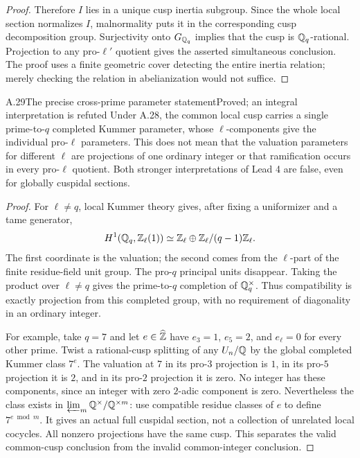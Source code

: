 \begin{proof}
Therefore $I$ lies in a unique cusp inertia subgroup. Since the whole local section normalizes $I$, malnormality puts it in the corresponding cusp decomposition group. Surjectivity onto $G_{\mathbb Q_q}$ implies that the cusp is $\mathbb Q_q$-rational. Projection to any pro-$\ell'$ quotient gives the asserted simultaneous conclusion. The proof uses a finite geometric cover detecting the entire inertia relation; merely checking the relation in abelianization would not suffice.
\end{proof}

\begin{statement}{A.29}{The precise cross-prime parameter statement}{Proved; an integral interpretation is refuted}
Under A.28, the common local cusp carries a single prime-to-$q$ completed Kummer parameter, whose $\ell$-components give the individual pro-$\ell$ parameters. This does not mean that the valuation parameters for different $\ell$ are projections of one ordinary integer or that ramification occurs in every pro-$\ell$ quotient. Both stronger interpretations of Lead 4 are false, even for globally cuspidal sections.
\end{statement}
\begin{proof}
For $\ell\ne q$, local Kummer theory gives, after fixing a uniformizer and a tame generator,
\[
H^1(\mathbb Q_q,\mathbb Z_\ell(1))\simeq
\mathbb Z_\ell\oplus\mathbb Z_\ell/(q-1)\mathbb Z_\ell.
\]
The first coordinate is the valuation; the second comes from the $\ell$-part of the finite residue-field unit group. The pro-$q$ principal units disappear. Taking the product over $\ell\ne q$ gives the prime-to-$q$ completion of $\mathbb Q_q^\times$. Thus compatibility is exactly projection from this completed group, with no requirement of diagonality in an ordinary integer.

For example, take $q=7$ and let $e\in\widehat{\mathbb Z}$ have $e_3=1$, $e_5=2$, and $e_\ell=0$ for every other prime. Twist a rational-cusp splitting of any $U_n/\mathbb Q$ by the global completed Kummer class $7^e$. The valuation at $7$ in its pro-$3$ projection is $1$, in its pro-$5$ projection it is $2$, and in its pro-$2$ projection it is zero. No integer has these components, since an integer with zero $2$-adic component is zero. Nevertheless the class exists in $\varprojlim_m\mathbb Q^\times/\mathbb Q^{\times m}$: use compatible residue classes of $e$ to define $7^{e\bmod m}$. It gives an actual full cuspidal section, not a collection of unrelated local cocycles. All nonzero projections have the same cusp. This separates the valid common-cusp conclusion from the invalid common-integer conclusion.
\end{proof}

